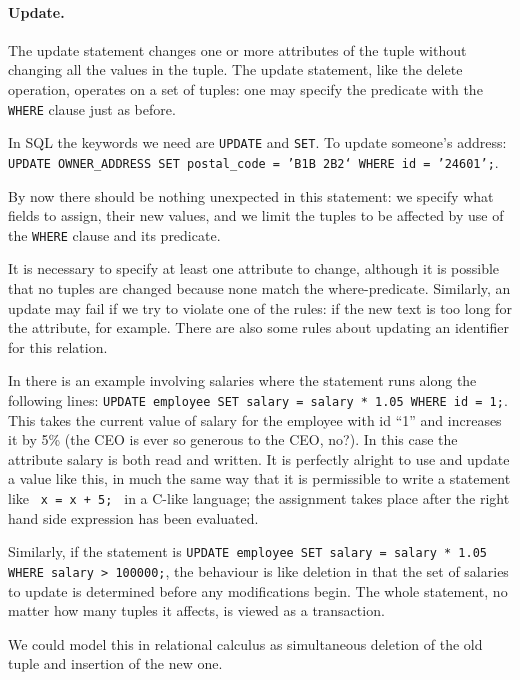 \paragraph{Update.} 
The update statement changes one or more attributes of the tuple without changing all the values in the tuple. The update statement, like the delete operation, operates on a set of tuples: one may specify the predicate with the \texttt{WHERE} clause just as before. 

In SQL the keywords we need are \texttt{UPDATE} and \texttt{SET}.  To update someone's address: \texttt{UPDATE OWNER\_ADDRESS SET postal\_code = 'B1B 2B2` WHERE id = '24601';}. 

By now there should be nothing unexpected in this statement: we specify what fields to assign, their new values, and we limit the tuples to be affected by use of the \texttt{WHERE} clause and its predicate. 

It is necessary to specify at least one attribute to change, although it is possible that no tuples are changed because none match the where-predicate. Similarly, an update may fail if we try to violate one of the rules: if the new text is too long for the attribute, for example. There are also some rules about updating an identifier for this relation. 

In \cite{dsc} there is an example involving salaries where the statement runs along the following lines: \texttt{UPDATE employee SET salary = salary * 1.05 WHERE id = 1;}. This takes the current value of salary for the employee with id ``1'' and increases it by 5\% (the CEO is ever so generous to the CEO, no?). In this case the attribute salary is both read and written. It is perfectly alright to use and update a value like this, in much the same way that it is permissible to write a statement like \texttt{ x = x + 5; } in a C-like language; the assignment takes place after the right hand side expression has been evaluated.

Similarly, if the statement is \texttt{UPDATE employee SET salary = salary * 1.05 WHERE salary > 100000;}, the behaviour is like deletion in that the set of salaries to update is determined before any modifications begin. The whole statement, no matter how many tuples it affects, is viewed as a transaction. 


We could model this in relational calculus as simultaneous deletion of the old tuple and insertion of the new one. 





